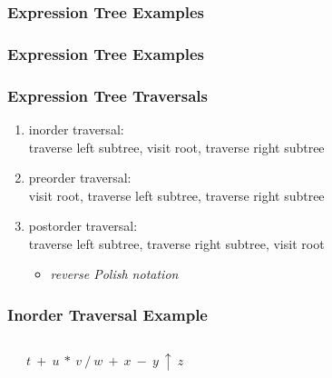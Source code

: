 \documentclass[dvipsnames]{beamer}
\begin{document}
\begin{frame}
  \frametitle{Expression Tree Examples}

  \begin{example}[$((7-a)/5)*((a+b) \uparrow 3)$]
    \begin{center}
    \end{center}
  \end{example}
\end{frame}

\begin{frame}
  \frametitle{Expression Tree Examples}

  \begin{example}[$t+(u*v)/(w+x-y \uparrow z)$]
    \begin{center}
    \end{center}
  \end{example}
\end{frame}

\begin{frame}
  \frametitle{Expression Tree Traversals}

  \begin{enumerate}
    \item \alert{inorder} traversal:\\
      traverse left subtree, visit root, traverse right subtree

    \medskip
    \item \alert{preorder} traversal:\\
      visit root, traverse left subtree, traverse right subtree

    \medskip
    \item \alert{postorder} traversal:\\
      traverse left subtree, traverse right subtree, visit root
    \begin{itemize}
      \item \emph{reverse Polish notation}
    \end{itemize}
  \end{enumerate}
\end{frame}

\begin{frame}
  \frametitle{Inorder Traversal Example}

  \begin{example}
    \begin{columns}
      \begin{center}
      \end{center}

      $t ~ + ~ u ~ * ~ v ~ / ~ w ~ + ~ x ~ - ~ y ~ \uparrow ~ z$
    \end{columns}
  \end{example}
\end{frame}
\end{document}

